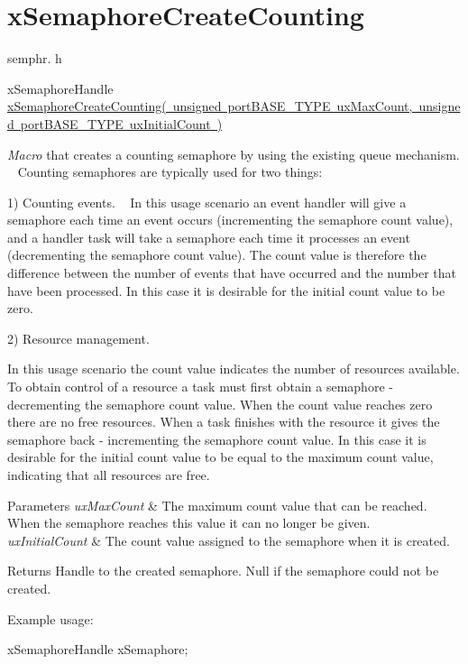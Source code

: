 \hypertarget{group__x_semaphore_create_counting}{}\section{x\+Semaphore\+Create\+Counting}
\label{group__x_semaphore_create_counting}
semphr. h 
\begin{DoxyPre}xSemaphoreHandle \mbox{\hyperlink{semphr_8h_a7764616a918a46115403569a88148ad4}{xSemaphoreCreateCounting( unsigned portBASE\_TYPE uxMaxCount, unsigned portBASE\_TYPE uxInitialCount )}}\end{DoxyPre}


{\itshape Macro} that creates a counting semaphore by using the existing queue mechanism. ~\newline
 Counting semaphores are typically used for two things\+:

1) Counting events. ~\newline
 In this usage scenario an event handler will \textquotesingle{}give\textquotesingle{} a semaphore each time an event occurs (incrementing the semaphore count value), and a handler task will \textquotesingle{}take\textquotesingle{} a semaphore each time it processes an event (decrementing the semaphore count value). The count value is therefore the difference between the number of events that have occurred and the number that have been processed. In this case it is desirable for the initial count value to be zero.

2) Resource management.

In this usage scenario the count value indicates the number of resources available. To obtain control of a resource a task must first obtain a semaphore -\/ decrementing the semaphore count value. When the count value reaches zero there are no free resources. When a task finishes with the resource it \textquotesingle{}gives\textquotesingle{} the semaphore back -\/ incrementing the semaphore count value. In this case it is desirable for the initial count value to be equal to the maximum count value, indicating that all resources are free.


\begin{DoxyParams}{Parameters}
{\em ux\+Max\+Count} & The maximum count value that can be reached. When the semaphore reaches this value it can no longer be \textquotesingle{}given\textquotesingle{}.\\
\hline
{\em ux\+Initial\+Count} & The count value assigned to the semaphore when it is created.\\
\hline
\end{DoxyParams}
\begin{DoxyReturn}{Returns}
Handle to the created semaphore. Null if the semaphore could not be created.
\end{DoxyReturn}
Example usage\+: 
\begin{DoxyPre}
xSemaphoreHandle xSemaphore;\end{DoxyPre}



